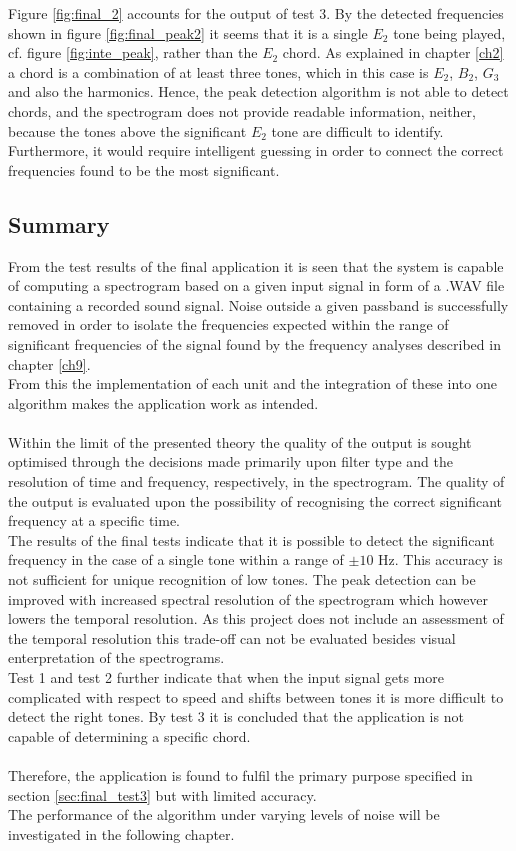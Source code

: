 Figure \ref{fig:final_2} accounts for the output of test 3. By the detected frequencies shown in figure \ref{fig:final_peak2} it seems that it is a single $E_2$ tone being played, cf. figure \ref{fig:inte_peak}, rather than the $E_2$ chord. As explained in chapter \ref{ch2} a chord is a combination of at least three tones, which in this case is $E_2$, $B_2$, $G_3$\hashsharp and also the harmonics. Hence, the peak detection algorithm is not able to detect chords, and the spectrogram does not provide readable information, neither, because the tones above the significant $E_2$ tone are difficult to identify. Furthermore, it would require intelligent guessing in order to connect the correct frequencies found to be the most significant.

\subsection{Summary}
From the test results of the final application it is seen that the system is capable of computing a spectrogram based on a given input signal in form of a .WAV file containing a recorded sound signal. Noise outside a given passband is successfully removed in order to isolate the frequencies expected within the range of significant frequencies of the signal found by the frequency analyses described in chapter \ref{ch9}. \\
From this the implementation of each unit and the integration of these into one algorithm makes the application work as intended. \\
\\
Within the limit of the presented theory the quality of the output is sought optimised through the decisions made primarily upon filter type and the resolution of time and frequency, respectively, in the spectrogram.
The quality of the output is evaluated upon the possibility of recognising the correct significant frequency at a specific time. \\
The results of the final tests indicate that it is possible to detect the significant frequency in the case of a single tone within a range of $\pm 10$ Hz. This accuracy is not sufficient for unique recognition of low tones. The peak detection can be improved with increased spectral resolution of the spectrogram which however lowers the temporal resolution. As this project does not include an assessment of the temporal resolution this trade-off can not be evaluated besides visual enterpretation of the spectrograms.\\        
Test 1 and test 2 further indicate that when the input signal gets more complicated with respect to speed and shifts between tones it is more difficult to detect the right tones. By test 3 it is concluded that the application is not capable of determining a specific chord. \\   
\\
Therefore, the application is found to fulfil the primary purpose specified in section \ref{sec:final_test3} but with limited accuracy.\\
The performance of the algorithm under varying levels of noise will be investigated in the following chapter.